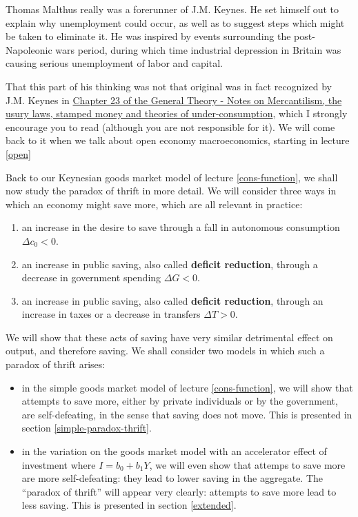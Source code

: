 \documentclass[]{book}
\theoremstyle{definition}
\theoremstyle{definition}
\theoremstyle{definition}
\theoremstyle{remark}
\begin{document}
Thomas Malthus really was a forerunner of J.M. Keynes. He set himself
out to explain why unemployment could occur, as well as to suggest steps
which might be taken to eliminate it. He was inspired by events
surrounding the post-Napoleonic wars period, during which time
industrial depression in Britain was causing serious unemployment of
labor and capital.

That this part of his thinking was not that original was in fact
recognized by J.M. Keynes in
\href{http://cas2.umkc.edu/economics/people/facultypages/kregel/courses/econ645/winter2011/generaltheory.pdf}{Chapter
23 of the General Theory - Notes on Mercantilism, the usury laws,
stamped money and theories of under-consumption}, which I strongly
encourage you to read (although you are not responsible for it). We will
come back to it when we talk about open economy macroeconomics, starting
in lecture \ref{open}

Back to our Keynesian goods market model of lecture \ref{cons-function},
we shall now study the paradox of thrift in more detail. We will
consider three ways in which an economy might save more, which are all
relevant in practice:

\begin{enumerate}
\def\labelenumi{\arabic{enumi}.}
\item
  an increase in the desire to save through a fall in autonomous
  consumption \(\Delta c_0<0\).
\item
  an increase in public saving, also called \textbf{deficit reduction},
  through a decrease in government spending \(\Delta G<0\).
\item
  an increase in public saving, also called \textbf{deficit reduction},
  through an increase in taxes or a decrease in transfers
  \(\Delta T>0\).
\end{enumerate}

We will show that these acts of saving have very similar detrimental
effect on output, and therefore saving. We shall consider two models in
which such a paradox of thrift arises:

\begin{itemize}
\item
  in the simple goods market model of lecture \ref{cons-function}, we
  will show that attempts to save more, either by private individuals or
  by the government, are self-defeating, in the sense that saving does
  not move. This is presented in section \ref{simple-paradox-thrift}.
\item
  in the variation on the goods market model with an accelerator effect
  of investment where \(I=b_0+b_1Y\), we will even show that attemps to
  save more are more self-defeating: they lead to lower saving in the
  aggregate. The ``paradox of thrift'' will appear very clearly:
  attempts to save more lead to less saving. This is presented in
  section \ref{extended}.
\end{itemize}
\end{document}
